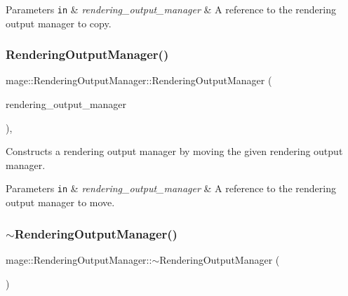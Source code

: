\begin{DoxyParams}[1]{Parameters}
\mbox{\tt in}  & {\em rendering\+\_\+output\+\_\+manager} & A reference to the rendering output manager to copy. \\
\hline
\end{DoxyParams}
\hypertarget{classmage_1_1_rendering_output_manager_a526ebcc48f73cc5d296ce01323024829}{}\label{classmage_1_1_rendering_output_manager_a526ebcc48f73cc5d296ce01323024829} 
\subsubsection{\texorpdfstring{Rendering\+Output\+Manager()}{RenderingOutputManager()}\hspace{0.1cm}{\footnotesize\ttfamily [3/3]}}
{\footnotesize\ttfamily mage\+::\+Rendering\+Output\+Manager\+::\+Rendering\+Output\+Manager (\begin{DoxyParamCaption}\item[{\hyperlink{classmage_1_1_rendering_output_manager}{Rendering\+Output\+Manager} \&\&}]{rendering\+\_\+output\+\_\+manager }\end{DoxyParamCaption})\hspace{0.3cm}{\ttfamily [default]}, {\ttfamily [noexcept]}}

Constructs a rendering output manager by moving the given rendering output manager.


\begin{DoxyParams}[1]{Parameters}
\mbox{\tt in}  & {\em rendering\+\_\+output\+\_\+manager} & A reference to the rendering output manager to move. \\
\hline
\end{DoxyParams}
\hypertarget{classmage_1_1_rendering_output_manager_ac6c1b4ce353870ea603982623962b2f4}{}\label{classmage_1_1_rendering_output_manager_ac6c1b4ce353870ea603982623962b2f4} 
\subsubsection{\texorpdfstring{$\sim$\+Rendering\+Output\+Manager()}{~RenderingOutputManager()}}
{\footnotesize\ttfamily mage\+::\+Rendering\+Output\+Manager\+::$\sim$\+Rendering\+Output\+Manager (\begin{DoxyParamCaption}{ }\end{DoxyParamCaption})\hspace{0.3cm}{\ttfamily [default]}}

